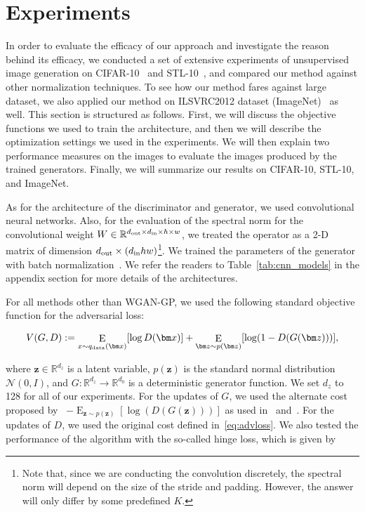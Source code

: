 \section{Experiments}
In order to evaluate the efficacy of our approach and investigate the reason behind its efficacy, we conducted a set of extensive experiments of unsupervised image generation on CIFAR-10~\cite[]{torralba200880} and STL-10~\cite[]{coates2011analysis}, and compared our method against other normalization techniques. To see how our method fares against large dataset, we also applied our method on ILSVRC2012 dataset (ImageNet)~\cite[]{ILSVRC15} as well. This section is structured as follows. First, we will discuss the objective functions we used to train the architecture, and then we will describe the optimization settings we used in the experiments. We will then explain two performance measures on the images to evaluate the images produced by the trained generators. Finally, we will summarize our results on CIFAR-10, STL-10, and ImageNet.

As for the architecture of the discriminator and generator, we used convolutional neural networks. Also, for the evaluation of the spectral norm for the convolutional weight $W \in \mathbb{R}^{d_{\rm out}\times d_{\rm in} \times h \times w}$, we treated the operator as a 2-D matrix of dimension $d_{\rm out}\times (d_{\rm in} h w)$\footnote{Note that, since we are conducting the convolution discretely, the spectral norm will depend on the size of the stride and padding. However, the answer will only differ by some predefined $K$.}. We trained the parameters of the generator with batch normalization~\cite[]{ioffe2015batch}.
We refer the readers to Table~\ref{tab:cnn_models} in the appendix section for more details of the architectures.

For all methods other than WGAN-GP, we used the following standard objective function for the adversarial loss:

\begin{align}
	V(G, D) := \mathop{\mathrm{E}}_{x\sim q_{\rm data}({\bm x})} [ \log D({\bm x})] +  \mathop{\mathrm{E}}_{{\bm z}\sim p({\bm z})} [\log(1-D(G({\bm z})))], \label{eq:advloss}
\end{align}

where ${\bm z} \in \mathbb{R}^{d_z}$ is a latent variable, $p({\bm z})$ is the standard normal distribution $\mathcal{N}(0, I)$, and $G: \mathbb{R}^{d_z} \to \mathbb{R}^{d_0}$ is a deterministic generator function. We set $d_z$ to 128 for all of our experiments. For the updates of $G$, we used the alternate cost proposed by~\cite{goodfellow2014generative}
$-\mathop{\mathrm{E}}_{{\bm z}\sim p({\bm z})} [\log(D(G({\bm z})))]$ as used in~\cite{goodfellow2014generative} and~\cite{warde2016improving}. For the updates of $D$, we used the original cost defined in~\eqref{eq:advloss}.
We also tested the performance of the algorithm with the so-called hinge loss, which is given by

